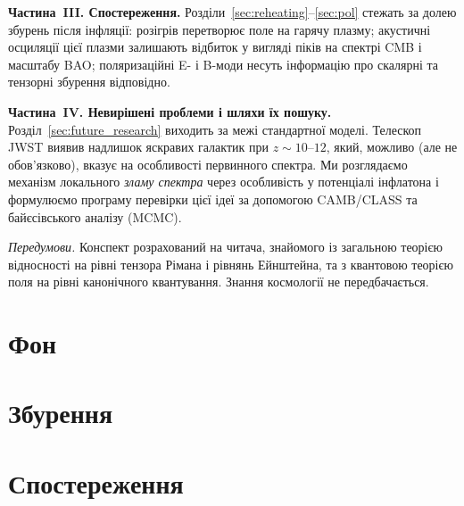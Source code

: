 \documentclass[12pt, a4paper, openany]{book}
\begin{document}
\textbf{Частина~III. Спостереження.} Розділи~\ref{sec:reheating}–\ref{sec:pol}
стежать за долею збурень після інфляції: розігрів перетворює поле на
гарячу плазму; акустичні осциляції цієї плазми залишають відбиток у
вигляді піків на спектрі CMB і масштабу BAO; поляризаційні E- і B-моди
несуть інформацію про скалярні та тензорні збурення відповідно.

\textbf{Частина~IV. Невирішені проблеми і шляхи їх пошуку.} Розділ~\ref{sec:future_research}
виходить за межі стандартної моделі. Телескоп JWST виявив надлишок яскравих
галактик при $z \sim 10$–$12$, який, можливо (але не обов'язково), вказує на
особливості первинного спектра. Ми розглядаємо
механізм локального \emph{зламу спектра} через особливість у потенціалі
інфлатона і формулюємо програму перевірки цієї ідеї за допомогою
CAMB/CLASS та байєсівського аналізу (MCMC).

\bigskip
\noindent
\textit{Передумови.} Конспект розрахований на читача, знайомого із
загальною теорією відносності на рівні тензора Рімана і рівнянь
Ейнштейна, та з квантовою теорією поля на рівні канонічного
квантування. Знання космології не передбачається.

\newpage

\part{Фон}




\part{Збурення}



\part{Спостереження}





\end{document}
